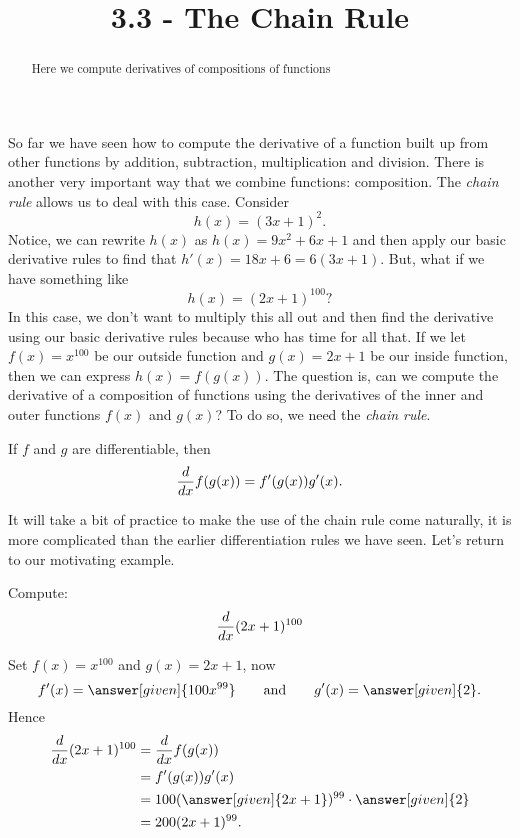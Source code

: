 \documentclass{ximera}
\title{3.3 - The Chain Rule}
\begin{document}
\begin{abstract}
  Here we compute derivatives of compositions of functions
\end{abstract}
\maketitle

So far we have seen how to compute the derivative of a function built up from other functions by addition, subtraction, multiplication and
division. There is another very important way that we combine
functions: composition. The \textit{chain rule} allows us to deal with
this case. Consider
\[
h(x) = (3x+1)^2.
\] 
Notice, we can rewrite $h(x)$ as $h(x)=9x^2+6x+1$ and then apply our basic derivative rules to find that $h'(x)=18x+6=6(3x+1)$. But, what if we have something like 
\[h(x)=(2x+1)^{100}?\]
In this case, we don't want to multiply this all out and then find the derivative using our basic derivative rules because who has time for all that.
If we let $f(x) = x^{100}$ be our outside function and $g(x) = 2x+1$ be our inside function, then we can express
$h(x) = f(g(x))$. The question is, can we compute the derivative of a
composition of functions using the derivatives of the inner and outer functions
$f(x)$ and $g(x)$? To do so, we need the \textit{chain rule}.



\begin{theorem}
If $f$ and $g$ are differentiable, then
\[
\frac{d}{\mathop{}\!d x} f(g(x)) = f'(g(x))g'(x).
\]
\end{theorem}



It will take a bit of practice to make the use of the chain rule come
naturally, it is more complicated than the earlier differentiation
rules we have seen. Let's return to our motivating example.

\begin{example}
Compute:
\[
\frac{d}{\mathop{}\!d x} (2x+1)^{100}
\]

\begin{explanation}
Set $f(x) = x^{100}$ and $g(x) = 2x+1$, now
\[
f'(x) = \answer[given]{100x^{99}} \qquad\text{and}\qquad g'(x) = \answer[given]{2}.
\]
Hence
\begin{align*}
\ddx (2x+1)^{100} &= \ddx f(g(x))\\ 
&=f'(g(x))g'(x) \\
&= 100(\answer[given]{2x+1})^{99}\cdot \answer[given]{2}\\
&= 200(2x+1)^{99}.
\end{align*}
\end{explanation}
\end{example}
\end{document}
